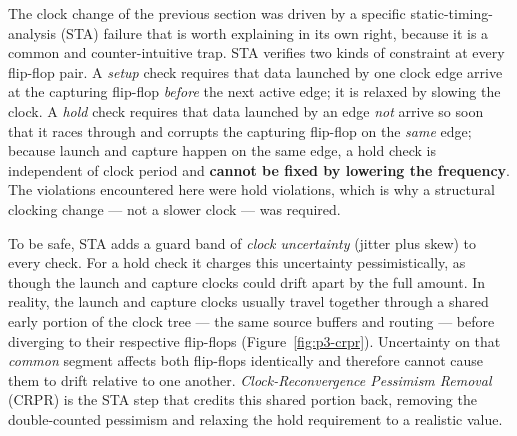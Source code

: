 The clock change of the previous section was driven by a specific static-timing-analysis (STA)
failure that is worth explaining in its own right, because it is a common and counter-intuitive
trap. STA verifies two kinds of constraint at every flip-flop pair. A \emph{setup} check requires
that data launched by one clock edge arrive at the capturing flip-flop \emph{before} the next active
edge; it is relaxed by slowing the clock. A \emph{hold} check requires that data launched by an edge
\emph{not} arrive so soon that it races through and corrupts the capturing flip-flop on the
\emph{same} edge; because launch and capture happen on the same edge, a hold check is independent of
clock period and \textbf{cannot be fixed by lowering the frequency}. The violations encountered here
were hold violations, which is why a structural clocking change --- not a slower clock --- was
required.

To be safe, STA adds a guard band of \emph{clock uncertainty} (jitter plus skew) to every check. For
a hold check it charges this uncertainty pessimistically, as though the launch and capture clocks
could drift apart by the full amount. In reality, the launch and capture clocks usually travel
together through a shared early portion of the clock tree --- the same source buffers and routing ---
before diverging to their respective flip-flops (Figure~\ref{fig:p3-crpr}). Uncertainty on that
\emph{common} segment affects both flip-flops identically and therefore cannot cause them to drift
relative to one another. \emph{Clock-Reconvergence Pessimism Removal} (CRPR) is the STA step that
credits this shared portion back, removing the double-counted pessimism and relaxing the hold
requirement to a realistic value.

